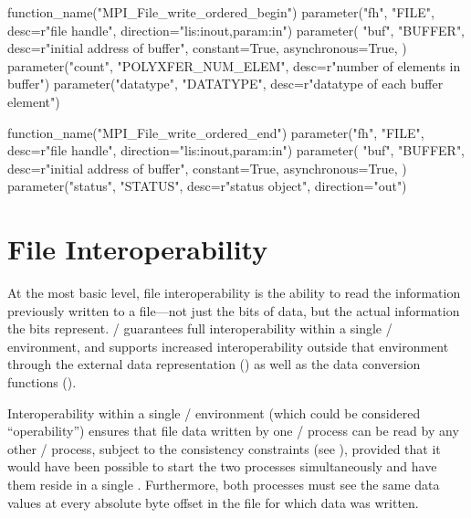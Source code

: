 %
\begin{mpi-binding}
    function_name("MPI_File_write_ordered_begin")
    parameter("fh", "FILE", desc=r"file handle", direction="lis:inout,param:in")
    parameter(
        "buf",
        "BUFFER",
        desc=r"initial address of buffer",
        constant=True,
        asynchronous=True,
    )
    parameter("count", "POLYXFER_NUM_ELEM", desc=r"number of elements in buffer")
    parameter("datatype", "DATATYPE", desc=r"datatype of each buffer element")
\end{mpi-binding}

%
%
\begin{mpi-binding}
    function_name("MPI_File_write_ordered_end")
    parameter("fh", "FILE", desc=r"file handle", direction="lis:inout,param:in")
    parameter(
        "buf",
        "BUFFER",
        desc=r"initial address of buffer",
        constant=True,
        asynchronous=True,
    )
    parameter("status", "STATUS", desc=r"status object", direction="out")
\end{mpi-binding}

\section{File Interoperability}
\label{sec:io-file-interop}

At the most basic level, file interoperability is the ability to
read the information previously written to a file---not just the
bits of data, but the actual information the bits represent.
\MPI/ guarantees full interoperability within a single \MPI/ environment,
and supports increased interoperability outside that environment
through the external data representation () as
well as the data conversion functions (). 

Interoperability within a single \MPI/ environment
(which could be considered ``operability'') ensures that file
data written by one \MPI/ process can be read by any other \MPI/ process,
subject to the consistency constraints
(see ),
provided that it would have been possible to start the two processes
simultaneously and have them reside in a single .
Furthermore, both processes must see the same data values at every absolute
byte offset in the file for which data was written.

